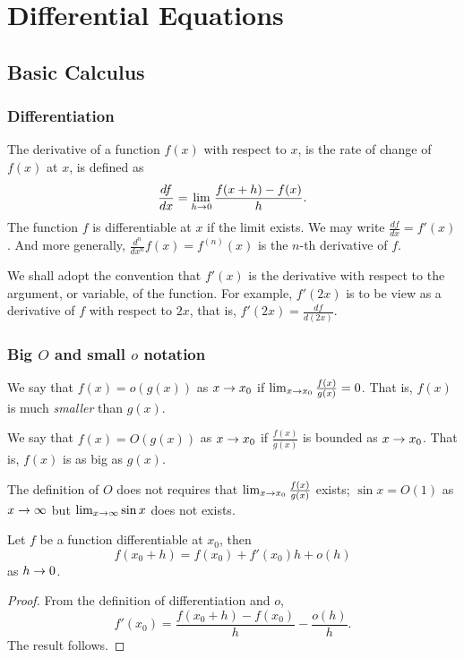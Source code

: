 \documentclass[main.tex]{subfiles}
\begin{document}
	\chapter{Differential Equations}
		\section{Basic Calculus}
			\subsection{Differentiation}
			\begin{definition}
					The derivative of a function $f(x)$ with respect to $x$, is the rate of change of $f(x)$ at $x$, is defined as
					\begin{equation}
						\frac{df}{dx} = \lim_{h \rightarrow 0} \frac{f(x + h) - f(x)}{h}.
					\end{equation}
					The function $f$ is differentiable at $x$ if the limit exists. We may write $\frac{df}{dx} = f'(x)$. And more generally, $\frac{d^n}{dx^n} f(x) = f^{(n)}(x)$ is the $n$-th derivative of $f$.
			\end{definition}
			We shall adopt the convention that $f'(x)$ is the derivative with respect to the argument, or variable, of the function. For example, $f'(2x)$ is to be view as a derivative of $f$ with respect to $2x$, that is, $f'(2x) = \frac{df}{d(2x)}$.
			
			\subsection{Big $O$ and small $o$ notation}
				\begin{definition}
					We say that $f(x) = o(g(x))$ as $x \rightarrow x_0$ if $\lim_{x\rightarrow x_0} \frac{f(x)}{g(x)} = 0$. That is, $f(x)$ is much \textit{smaller} than $g(x)$.
				\end{definition}
				\begin{definition}
					We say that $f(x) = O(g(x))$ as $x \rightarrow x_0$ if $\frac{f(x)}{g(x)}$ is bounded as $x \rightarrow x_0$. That is, $f(x)$ is as big as $g(x)$.
				\end{definition}
				The definition of $O$ does not requires that $\lim_{x \rightarrow x_0}\frac{f(x)}{g(x)}$ exists; $\sin x = O(1)$ as $x \rightarrow \infty$ but $\lim_{x \rightarrow \infty} \sin x$ does not exists.
				
				\begin{theorem}
					Let $f$ be a function differentiable at $x_0$, then
					\begin{equation}
						f(x_0 + h) = f(x_0) + f'(x_0)h + o(h)
					\end{equation}
				as $h \rightarrow 0$.
				\end{theorem}
				\begin{proof}
					From the definition of differentiation and $o$,
					\begin{equation}
						f'(x_0) = \frac{f(x_0 + h) - f(x_0)}{h} - \frac{o(h)}{h}.
					\end{equation}
					The result follows.
				\end{proof}		
\end{document}
